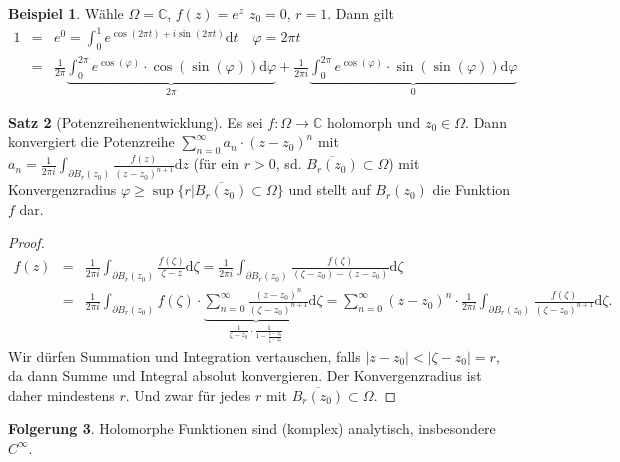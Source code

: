 \documentclass[11pt,titlepage]{article}
\theoremstyle{definition}
\newtheorem{theorem}{Satz}[section]
\newtheorem{corollary}[theorem]{Folgerung}
\newtheorem{example}[theorem]{Beispiel}
\theoremstyle{remark}
\begin{document}
	\begin{example}
		Wähle $\Omega=\mathbb{C}$, $f(z)=e^z$ $z_0 =0$, $r=1$. Dann gilt
		\begin{eqnarray*}
			1&=& e^0 = \int_0^1 e^{\cos(2\pi t)+i\sin (2\pi t)}\mathrm{d}t \quad \varphi=2\pi t \\
			&=& \frac{1}{2\pi} \underbrace{\int_0^{2\pi} e^{\cos(\varphi)}\cdot \cos(\sin(\varphi)) 
			\mathrm{d}\varphi }_{2\pi} +\frac{1}{2\pi i} \underbrace{\int_0^{2\pi}e^{\cos(\varphi)}\cdot 
			\sin(\sin(\varphi))\mathrm{d}\varphi}_{0}
		\end{eqnarray*}
	\end{example}
	
	\begin{theorem}[Potenzreihenentwicklung]
		Es sei $f:\Omega\to\mathbb{C}$ holomorph und $z_0\in\Omega$. Dann konvergiert die 
		Potenzreihe $\sum_{n=0}^{\infty} a_n \cdot (z-z_0)^n$ mit $a_n = \frac{1}{2\pi i} \int_{\partial B_r 
		(z_0)} \frac{f(z)}{(z-z_0)^{n+1}}\mathrm{d}z$ (für ein $r>0$, sd. $\overline{B_r (z_0)}
		\subset\Omega$) mit Konvergenzradius $\varphi \geq \sup\{r|\overline{B_r (z_0)}
		\subset\Omega\}$ und stellt auf $B_r (z_0)$ die Funktion $f$ dar.
	\end{theorem}
	
	\begin{proof}
		\begin{eqnarray*}
			f(z) &=& \frac{1}{2\pi i} \int_{\partial B_r (z_0)} \frac{f(\zeta)}{\zeta -z}\mathrm{d}\zeta 
			= \frac{1}{2\pi i}\int_{\partial B_r (z_0)} \frac{f(\zeta)}{(\zeta - z_0)-(z-z_0)}\mathrm{d}\zeta \\
			&=& \frac{1}{2\pi i} \int_{\partial B_r (z_0)} f(\zeta)\cdot \underbrace{\sum_{n=0}^{\infty} 
			\frac{(z-z_0)^n}{(\zeta - z_0)^{n+1}}}_{\frac{1}{\zeta -z_0}\cdot\frac{1}{1-\frac{z-z_0}
			{\zeta -z_0}}}\mathrm{d}\zeta 
			= \sum_{n=0}^{\infty} (z-z_0)^n \cdot \frac{1}{2\pi i} \int_{\partial B_r (z_0)} 
			\frac{f(\zeta)}{(\zeta -z_0)^{n+1}} \mathrm{d}\zeta.
		\end{eqnarray*}
		Wir dürfen Summation und Integration vertauschen, falls $|z-z_0|<|\zeta -z_0|=r$, da dann 
		Summe und Integral absolut konvergieren. Der Konvergenzradius ist daher mindestens $r$. 
		Und zwar für jedes $r$ mit $\overline{B_r (z_0)}\subset\Omega$.
	\end{proof}
	
	\begin{corollary}\label{coroll:holo}
		Holomorphe Funktionen sind (komplex) analytisch, insbesondere $C^{\infty}$.
	\end{corollary}
	
\end{document}
